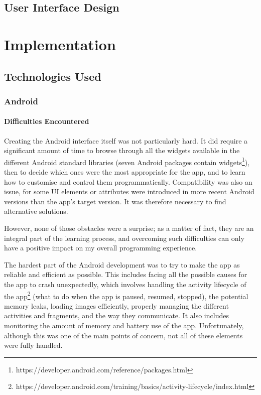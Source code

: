 \documentclass{mproj}
\begin{document}
\section{User Interface Design}


\chapter{Implementation}

\section{Technologies Used}

\subsection{Android}

\subsubsection*{Difficulties Encountered}

Creating the Android interface itself was not particularly hard. It did require a significant amount of time to browse through all the widgets available in the different Android standard libraries (seven Android packages contain widgets\footnote{https://developer.android.com/reference/packages.html}), then to decide which ones were the most appropriate for the app, and to learn how to customise and control them programmatically. Compatibility was also an issue, for some UI elements or attributes were introduced in more recent Android versions than the app's target version. It was therefore necessary to find alternative solutions. \par

However, none of those obstacles were a surprise; as a matter of fact, they are an integral part of the learning process, and overcoming such difficulties can only have a positive impact on my overall programming experience. \par

The hardest part of the Android development was to try to make the app as reliable and efficient as possible. This includes facing all the possible causes for the app to crash unexpectedly, which involves handling the activity lifecycle of the app\footnote{https://developer.android.com/training/basics/activity-lifecycle/index.html} (what to do when the app is paused, resumed, stopped), the potential memory leaks, loading images efficiently, properly managing the different activities and fragments, and the way they communicate. It also includes monitoring the amount of memory and battery use of the app.
Unfortunately, although this was one of the main points of concern, not all of these elements were fully handled. \par
\end{document}

